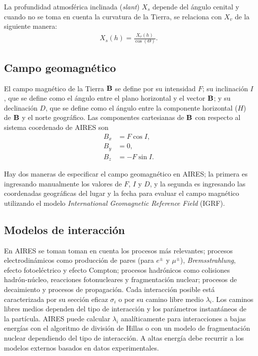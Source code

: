 	La profundidad atmosférica inclinada (\textit{slant}) $X_s$ depende del ángulo cenital y cuando no se toma en cuenta la curvatura de la Tierra, se relaciona con $X_v$ de la siguiente manera:
	\begin{align}
	X_s (h) = \frac{X_v (h)}{\cos(\Theta)}.
	\end{align}
	
	\subsection{Campo geomagnético}
	El campo magnético de la Tierra $\vb{B}$ se define por su intensidad $F$; su inclinación $I$, que se define como el ángulo entre el plano horizontal y el vector $\vb{B}$; y su declinación $D$, que se define como el ángulo entre la componente horizontal ($H$) de $\vb{B}$ y el norte geográfico. Las componentes cartesianas de $\vb{B}$ con respecto al sistema coordenado de AIRES son 
	\begin{align}
	B_x &= F \cos I, \\
	B_y &= 0, \\
	B_z &= -F \sin I.
	\end{align}	 
	
	Hay dos maneras de especificar el campo geomagnético en AIRES; la primera es ingresando manualmente los valores de $F$, $I$ y $D$, y la segunda es ingresando las coordenadas geográficas del lugar y la fecha para evaluar el campo magnético utilizando el modelo \textit{International Geomagnetic Reference Field} (IGRF).  	
	
	\subsection{Modelos de interacción}
	En AIRES se toman toman en cuenta los procesos más relevantes; procesos electrodinámicos como producción de pares (para $e^{\pm}$ y $\mu^{\pm}$), \textit{Bremsstrahlung}, efecto fotoeléctrico y efecto Compton; procesos hadrónicos como colisiones hadrón-núcleo, reacciones fotonucleares y fragmentación nuclear; procesos de decaimiento y procesos de propagación. Cada interacción posible está caracterizada por su sección eficaz $\sigma_i$ o por su camino libre medio $\lambda_i$. Los caminos libres medios dependen del tipo de interacción y los parámetros instantáneos de la partícula. AIRES puede calcular $\lambda_i$ analíticamente para interacciones a bajas energ\'ias con el algoritmo de divisi\'on de Hillas o con un modelo de fragmentaci\'on nuclear dependiendo del tipo de interacci\'on. A altas energ\'ia debe recurrir a los modelos externos basados en datos experimentales. 
	
